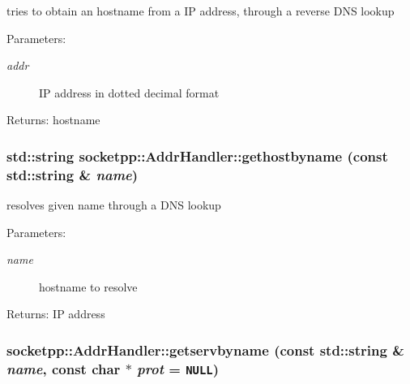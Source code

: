 tries to obtain an hostname from a IP address, through a reverse DNS lookup 

\begin{Desc}
\item[Parameters:]
\begin{description}
\item[{\em addr}]IP address in dotted decimal format \end{description}
\end{Desc}
\begin{Desc}
\item[Returns:]hostname \end{Desc}
\hypertarget{classsocketpp_1_1AddrHandler_19aebc1e9779dee4e5f06d7b39e18959}{
\subsubsection[{gethostbyname}]{\setlength{\rightskip}{0pt plus 5cm}std::string socketpp::AddrHandler::gethostbyname (const std::string \& {\em name})}}
\label{classsocketpp_1_1AddrHandler_19aebc1e9779dee4e5f06d7b39e18959}


resolves given name through a DNS lookup 

\begin{Desc}
\item[Parameters:]
\begin{description}
\item[{\em name}]hostname to resolve \end{description}
\end{Desc}
\begin{Desc}
\item[Returns:]IP address \end{Desc}
\hypertarget{classsocketpp_1_1AddrHandler_b4a42f2b0f3842d681ea0cbe6810d6ff}{
\subsubsection[{getservbyname}]{ socketpp::AddrHandler::getservbyname (const std::string \& {\em name}, \/  const char $\ast$ {\em prot} = {\tt NULL})}}
\label{classsocketpp_1_1AddrHandler_b4a42f2b0f3842d681ea0cbe6810d6ff}


